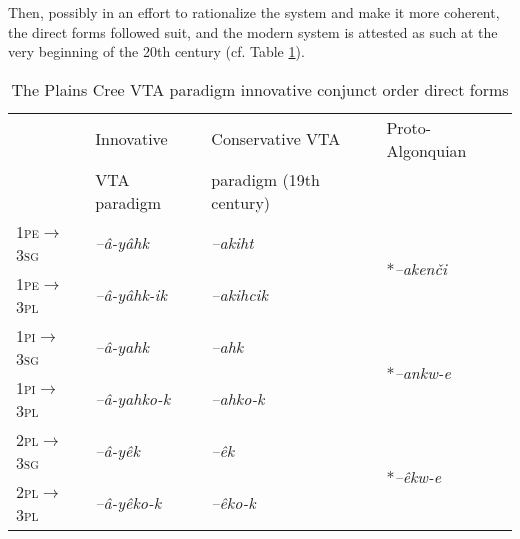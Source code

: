 \documentclass[twoside,a4paper,11pt]{article}
\newcommand{\ipa}[1]{{\phon\textit{#1}}}
\newcommand{\sg}{\textsc{sg}}
\newcommand{\pl}{\textsc{pl}}
\newcommand{\grise}[1]{\cellcolor{lightgray}\textbf{#1}}
\newcommand{\Σ}{\greek{Σ}}
\newcommand{\pli}{\textsc{pi}}
\newcommand{\pe}{\textsc{pe}}
\begin{document}
Then, possibly in an effort to rationalize the system and make it more coherent, the direct forms followed suit, and the modern system is attested as such at the very beginning of the 20th century (cf. Table \ref{tab:cree.vta.innov.dir}).

\begin{table}[H]
\caption{The Plains Cree VTA paradigm innovative conjunct order direct forms}
\centering \label{tab:cree.vta.innov.dir}
\begin{tabular}{llll}
\toprule
& Innovative & Conservative VTA & Proto-Algonquian \\
& VTA paradigm & paradigm (19th century) &\\
\midrule
1\pe$\rightarrow$3\sg & 	\ipa{--â-yâhk} \grise{}& 	\ipa{--akiht} & \multirow{2}{*}{*\ipa{--akenči}} \\
1\pe$\rightarrow$3\pl & 	\ipa{--â-yâhk-ik} \grise{}& 	\ipa{--akihcik} \grise{} & \multirow{-2}{*}{}\\
1\pli$\rightarrow$3\sg & 	\ipa{--â-yahk} \grise{}& 	\ipa{--ahk}  &\multirow{2}{*}{*\ipa{--ankw-e}} \\
1\pli$\rightarrow$3\pl & 	\ipa{--â-yahko-k} \grise{}& 	\ipa{--ahko-k} \grise{} & \multirow{-2}{*}{} \\
\midrule
2\pl$\rightarrow$3\sg & \ipa{--â-yêk} \grise{} & \ipa{--êk} &\multirow{2}{*}{*\ipa{--êkw-e}}\\
2\pl$\rightarrow$3\pl & \ipa{--â-yêko-k} \grise{} & \ipa{--êko-k}\grise{} & \multirow{-2}{*}{}\\
\bottomrule
\end{tabular}
\end{table}
\end{document}
